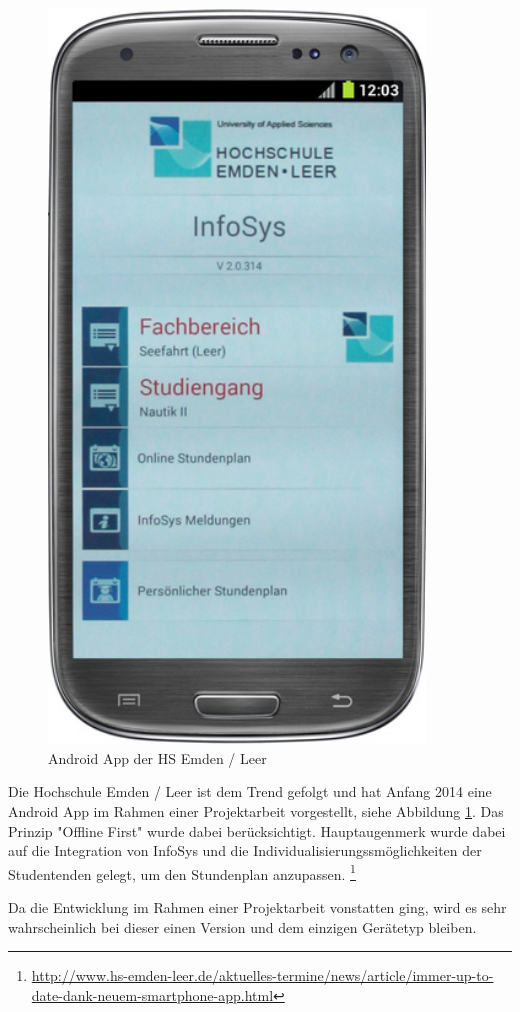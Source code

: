 \begin{figure}[h!]
	\centering
	\includegraphics[width=10cm]{kapitel/gruppe1_2/bilder/hsel-androidapp}
	\caption{Android App der HS Emden / Leer}
	\label{fig_hselandroidapp}
\end{figure}

Die Hochschule Emden / Leer ist dem Trend gefolgt und hat Anfang 2014 eine Android App im Rahmen einer Projektarbeit vorgestellt, siehe Abbildung \ref{fig_hselandroidapp}. Das Prinzip "Offline First" wurde dabei berücksichtigt. Hauptaugenmerk wurde dabei auf die Integration von InfoSys und die Individualisierungssmöglichkeiten der Studentenden gelegt, um den Stundenplan anzupassen. \footnote{\url{http://www.hs-emden-leer.de/aktuelles-termine/news/article/immer-up-to-date-dank-neuem-smartphone-app.html}}

Da die Entwicklung im Rahmen einer Projektarbeit vonstatten ging, wird es sehr wahrscheinlich bei dieser einen Version und dem einzigen Gerätetyp bleiben.

